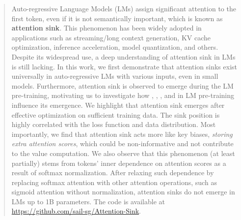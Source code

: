 \begin{abstract}
    Auto-regressive Language Models (LMs) assign significant attention to the first token, even if it is not semantically important, which is known as \textbf{attention sink}. This phenomenon has been widely adopted in applications such as streaming/long context generation, KV cache optimization, inference acceleration, model quantization, and others. Despite its widespread use, a deep understanding of attention sink in LMs is still lacking. In this work, we first demonstrate that attention sinks exist universally in auto-regressive LMs with various inputs, even in small models. Furthermore, attention sink is observed to emerge during the LM pre-training, motivating us to investigate how {\color{cc1}{optimization}}, {\color{cc2}{data distribution}}, {\color{cc3}{loss function}}, and {\color{cc4}{model architecture}} in LM pre-training influence its emergence. We highlight that attention sink emerges after effective optimization on sufficient training data. The sink position is highly correlated with the loss function and data distribution. Most importantly, we find that attention sink acts more like key biases, \emph{storing extra attention scores}, which could be non-informative and not contribute to the value computation. We also observe that this phenomenon (at least partially) stems from tokens' inner dependence on attention scores as a result of softmax normalization. After relaxing such dependence by replacing softmax attention with other attention operations, such as sigmoid attention without normalization, attention sinks do not emerge in LMs up to 1B parameters. The code is available at \href{https://github.com/sail-sg/Attention-Sink}{https://github.com/sail-sg/Attention-Sink}.  
\end{abstract}


